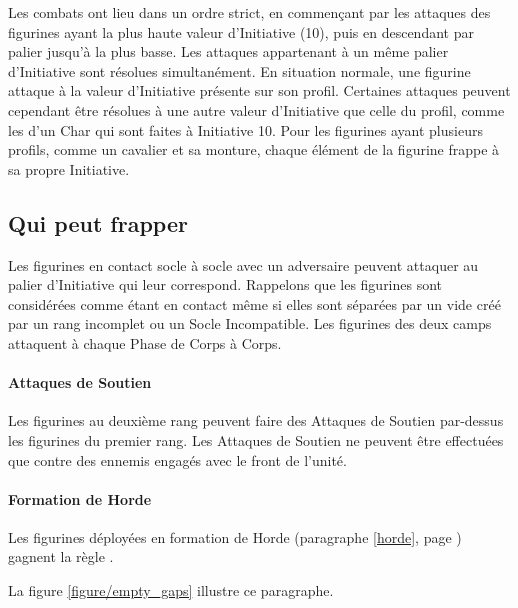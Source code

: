 \vspace*{0.5cm}
Les combats ont lieu dans un ordre strict, en commençant par les attaques des figurines ayant la plus haute valeur d'Initiative (10), puis en descendant par palier jusqu'à la plus basse. Les attaques appartenant à un même palier d'Initiative sont résolues simultanément. En situation normale, une figurine attaque à la valeur d'Initiative présente sur son profil. Certaines attaques peuvent cependant être résolues à une autre valeur d'Initiative que celle du profil, comme les \impacthits{} d'un Char qui sont faites à Initiative 10. Pour les figurines ayant plusieurs profils, comme un cavalier et sa monture, chaque élément de la figurine frappe à sa propre Initiative.

\subsection{Qui peut frapper}

Les figurines en contact socle à socle avec un adversaire peuvent attaquer au palier d'Initiative qui leur correspond. Rappelons que les figurines sont considérées comme étant en contact même si elles sont séparées par un vide créé par un rang incomplet ou un Socle Incompatible. Les figurines des deux camps attaquent à chaque Phase de Corps à Corps.

\paragraph{Attaques de Soutien}

Les figurines au deuxième rang peuvent faire des Attaques de Soutien par-dessus les figurines du premier rang. Les Attaques de Soutien ne peuvent être effectuées que contre des ennemis engagés avec le front de l'unité.

\paragraph{Formation de Horde}

Les figurines déployées en formation de Horde (paragraphe \ref{horde}, page \pageref{horde}) gagnent la règle \fightinextrarank{}.

La figure \ref{figure/empty_gaps} illustre ce paragraphe.

